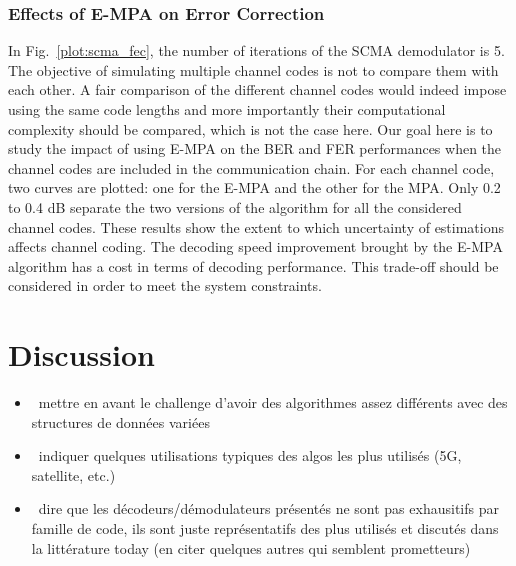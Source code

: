 \subsubsection{Effects of E-MPA on Error Correction}
\label{sec:scma_fec_e-mpa}

In Fig.~\ref{plot:scma_fec}, the number of iterations of the SCMA demodulator is
5. The objective of simulating multiple channel codes is not to compare them
with each other. A fair comparison of the different channel codes would indeed
impose using the same code lengths and more importantly their computational
complexity should be compared, which is not the case here. Our goal here is to
study the impact of using E-MPA on the BER and FER performances when the channel
codes are included in the communication chain. For each channel code, two curves
are plotted: one for the E-MPA and the other for the MPA. Only 0.2 to 0.4 dB
separate the two versions of the algorithm for all the considered channel codes.
These results show the extent to which uncertainty of estimations affects
channel coding. The decoding speed improvement brought by the E-MPA algorithm
has a cost in terms of decoding performance. This trade-off should be considered
in order to meet the system constraints.

\section{Discussion}

\begin{itemize}
  \item \xmark~mettre en avant le challenge d'avoir des algorithmes assez
    différents avec des structures de données variées
  \item \xmark~indiquer quelques utilisations typiques des algos les plus
    utilisés (5G, satellite, etc.)
  \item \xmark~dire que les décodeurs/démodulateurs présentés ne sont pas
    exhausitifs par famille de code, ils sont juste représentatifs des plus
    utilisés et discutés dans la littérature today (en citer quelques autres qui
    semblent prometteurs)
\end{itemize}